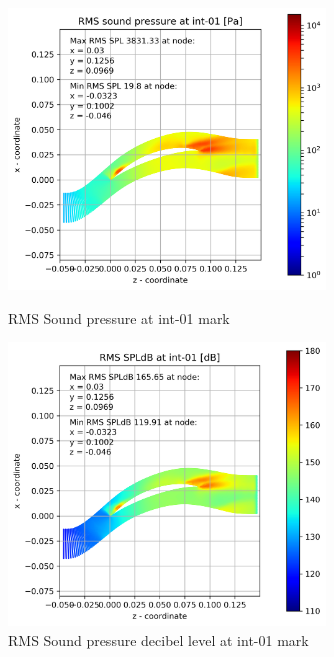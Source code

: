\begin{figure}[ht]
  \centering
  \includegraphics[width=0.75\textwidth]{Figures/int-01-rms-spl.png}
  \caption{RMS Sound pressure at int-01 mark} \label{int-01-rms-spl}
  
  \vspace*{\floatsep}%

  \includegraphics[width=0.75\textwidth]{Figures/int-01-rms-spldb.png}
  \caption{RMS Sound pressure decibel level at int-01 mark} \label{int-01-rms-spldb}
\end{figure}
